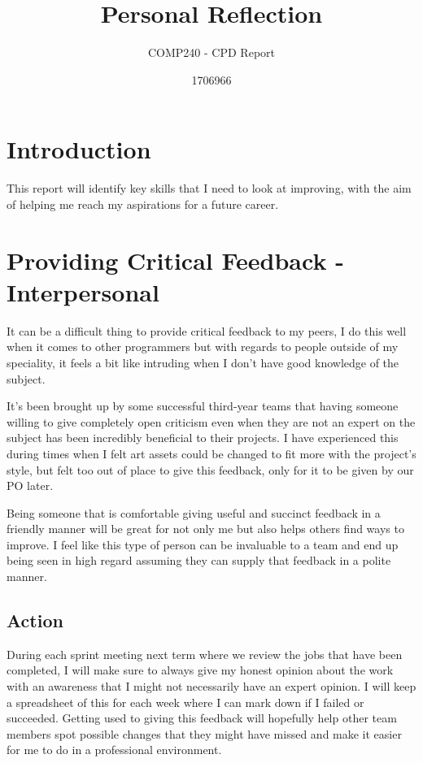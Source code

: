 \documentclass{scrartcl}
\title{Personal Reflection}
\subtitle{COMP240 - CPD Report}
\author{1706966}
\begin{document}
\maketitle

\section{Introduction}
This report will identify key skills that I need to look at improving, with the aim of helping me reach my aspirations for a future career.

\section{Providing Critical Feedback - Interpersonal}
It can be a difficult thing to provide critical feedback to my peers, I do this well when it comes to other programmers but with regards to people outside of my speciality, it feels a bit like intruding when I don't have good knowledge of the subject. 

It's been brought up by some successful third-year teams that having someone willing to give completely open criticism even when they are not an expert on the subject has been incredibly beneficial to their projects. I have experienced this during times when I felt art assets could be changed to fit more with the project's style, but felt too out of place to give this feedback, only for it to be given by our PO later. 

Being someone that is comfortable giving useful and succinct feedback in a friendly manner will be great for not only me but also helps others find ways to improve. I feel like this type of person can be invaluable to a team and end up being seen in high regard assuming they can supply that feedback in a polite manner.
\subsection{Action}
During each sprint meeting next term where we review the jobs that have been completed, I will make sure to always give my honest opinion about the work with an awareness that I might not necessarily have an expert opinion. I will keep a spreadsheet of this for each week where I can mark down if I failed or succeeded. Getting used to giving this feedback will hopefully help other team members spot possible changes that they might have missed and make it easier for me to do in a professional environment.
\end{document}
